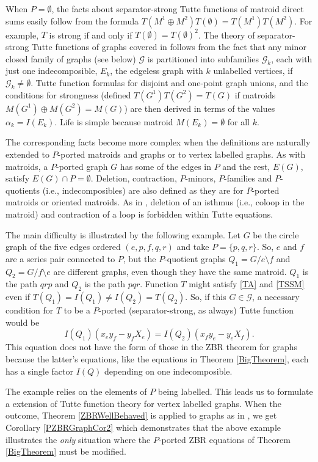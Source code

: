\documentclass[12pt,leqno]{amsart}
\theoremstyle{remark}
\begin{document}
When $P=\emptyset$, the facts about separator-strong Tutte functions
of matroid direct sums easily follow from the formula
$T(M^1\oplus M^2)T(\emptyset)=T(M^1)T(M^2)$.  For example,
$T$ is strong if and only if $T(\emptyset)=T(\emptyset)^2$.
The theory of separator-strong Tutte functions of graphs covered
in \cite{Ellis-Monaghan-Traldi}  follows from the fact that any
minor closed family of graphs (see below) $\mathcal{G}$ is partitioned into
subfamilies $\mathcal{G}_k$, each with just one indecomposible,
$E_k$, the edgeless graph with $k$ unlabelled vertices, 
if $\mathcal{G}_k\neq\emptyset$.
Tutte function formulas for disjoint and one-point graph unions, 
and the conditions for strongness (defined $T(G^1)T(G^2)=T(G)$ if
matroids $M(G^1)\oplus M(G^2)=M(G)$) are then 
derived \cite{Ellis-Monaghan-Traldi}
in terms of the values $\alpha_k=I(E_k)$.  Life is simple because
matroid $M(E_k)=\emptyset$ for all $k$.

The corresponding facts become more complex when the definitions
are naturally extended to $P$-ported matroids and graphs
or to vertex labelled graphs.  As with
matroids, a $P$-ported graph $G$ has some of the edges in $P$ and the rest,
$E(G)$, satisfy $E(G)\cap P=\emptyset$.  Deletion, contraction,
$P$-minors, $P$-families and $P$-quotients (i.e., indecomposibles)
are also defined as they are for $P$-ported matroids or oriented matroids.
As in \cite{Ellis-Monaghan-Traldi},
deletion of an isthmus (i.e., coloop in the matroid) and
contraction of a loop is forbidden within Tutte equations.

The main difficulty is illustrated by the following example.
Let
$G$ be the circle graph of the five edges
ordered $(e,p,f,q,r)$ and take $P=\{p,q,r\}$.  
So, $e$ and $f$ are a series pair connected to $P$, but
the $P$-quotient graphs $Q_1=G/e\setminus f$ and 
$Q_2=G/f\setminus e$ are different graphs, even though they have 
the same matroid.  $Q_1$ is the path $qrp$ and $Q_2$ is the path $pqr$.
Function $T$ might satisfy \eqref{TA}
and \eqref{TSSM} even if $T(Q_1)=I(Q_1)\neq I(Q_2)=T(Q_2)$.
So, if this $G\in\mathcal{G}$, a necessary condition 
for $T$ to be a $P$-ported
(separator-strong, as always) Tutte function would be
\[
I(Q_1)(x_ey_f - y_fX_e) = I(Q_2)(x_fy_e - y_eX_f).
\]
This equation does not have the form of 
those in the ZBR theorem for graphs \cite{Ellis-Monaghan-Traldi}
because the latter's equations, like the equations in
Theorem \ref{BigTheorem}, each has a single factor 
$I(Q)$ depending on one indecomposible.


The example relies on the elements of $P$ being labelled.
This leads us to formulate a extension of Tutte function theory
for vertex labelled graphs.  
When the outcome, Theorem \ref{ZBRWellBehaved} is applied to graphs as in 
\cite{Ellis-Monaghan-Traldi}, we get Corollary \ref{PZBRGraphCor2}
which demonstrates that the above example illustrates the
\emph{only} situation where the $P$-ported ZBR equations
of Theorem \ref{BigTheorem} must be modified.
\end{document}
